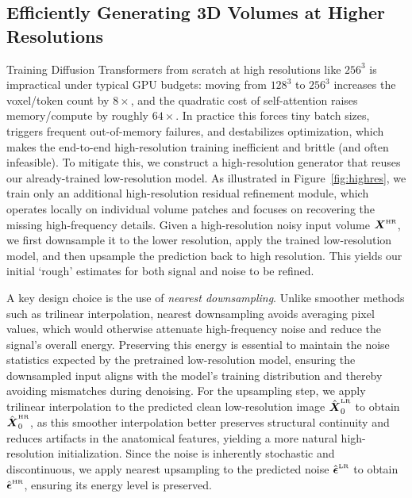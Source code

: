 \subsection{Efficiently Generating 3D Volumes at Higher Resolutions}
\label{m4}
Training Diffusion Transformers from scratch at high resolutions like $256^3$ is impractical under typical GPU budgets: moving from $128^3$ to $256^3$ increases the voxel/token count by $8\times$, and the quadratic cost of self-attention raises memory/compute by roughly $64\times$. In practice this forces tiny batch sizes, triggers frequent out-of-memory failures, and destabilizes optimization, which makes the end-to-end high-resolution training inefficient and brittle (and often infeasible).
To mitigate this, we construct a high-resolution generator that reuses our already-trained low-resolution model. As illustrated in Figure~\ref{fig:highres}, we train only an additional high-resolution residual refinement module, which operates locally on individual volume patches and focuses on recovering the missing high-frequency details.
Given a high-resolution noisy input volume $\boldsymbol{X}^{\text{\tiny{HR}}}$, we first downsample it to the lower resolution, apply the trained low-resolution model, and then upsample the prediction back to high resolution. This yields our initial `rough' estimates for both signal and noise to be refined. 

A key design choice is the use of \emph{nearest downsampling}. Unlike smoother methods such as trilinear interpolation, nearest downsampling avoids averaging pixel values, which would otherwise attenuate high-frequency noise and reduce the signal’s overall energy. Preserving this energy is essential to maintain the noise statistics expected by the pretrained low-resolution model, ensuring the downsampled input aligns with the model’s training distribution and thereby avoiding mismatches during denoising.  
For the upsampling step, we apply trilinear interpolation to the predicted clean low-resolution image $\hat{\boldsymbol{X}}_0^{\text{\tiny{LR}}}$ to obtain $\hat{\boldsymbol{X}}_0^{\text{\tiny{HR}}}$, as this smoother interpolation better preserves structural continuity and reduces artifacts in the anatomical features, yielding a more natural high-resolution initialization. Since the noise is inherently stochastic and discontinuous, we apply nearest upsampling to the predicted noise $\hat{\boldsymbol{\epsilon}}^{\text{\tiny{LR}}}$ to obtain $\hat{\boldsymbol{\epsilon}}^{\text{\tiny{HR}}}$, ensuring its energy level is preserved. 

